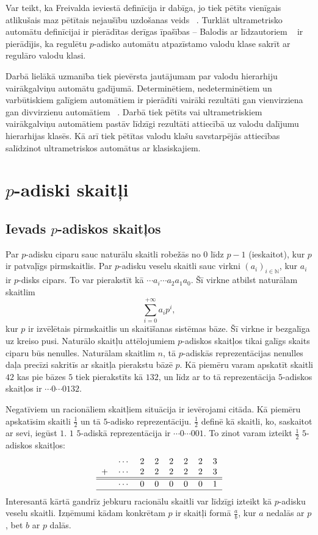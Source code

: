 \documentclass{ludis}
\begin{document}
Var teikt, ka Freivalda ieviestā definīcija ir dabīga, jo tiek pētīts vienīgais atlikušais maz pētītais nejaušību uzdošanas veids ~\citep{Freivalds2012}. Turklāt ultrametrisko automātu definīcijai ir pierādītas derīgas īpašības -- Balodis ar līdzautoriem ~\citep{KasparsBalodis2013} ir pierādījis, ka regulētu $p$-adisko automātu atpazīstamo valodu klase sakrīt ar regulāro valodu klasi.

Darbā lielākā uzmanība tiek pievērsta jautājumam par valodu hierarhiju vairākgalviņu automātu gadījumā. Determinētiem, nedeterminētiem un varbūtiskiem galīgiem automātiem ir pierādīti vairāki rezultāti gan vienvirziena gan divvirzienu automātiem ~\citep{Holzer2009,Yao1978,Monien1980,Macarie1995}. Darbā tiek pētīts vai ultrametriskiem vairākgalviņu automātiem pastāv līdzīgi rezultāti attiecībā uz valodu dalījumu hierarhijas klasēs. Kā arī tiek pētītas valodu klašu savstarpējās attiecības salīdzinot ultrametriskos automātus ar klasiskajiem.
\chapter{$p$-adiski skaitļi}
\section{Ievads $p$-adiskos skaitļos}
Par $p$-adisku ciparu sauc naturālu skaitli robežās no $0$ līdz $p-1$ (ieskaitot), kur $p$ ir patvaļīgs pirmskaitlis. Par $p$-adisku veselu skaitli sauc virkni $(a_i)_{i \in \mathbb{N}}$, kur $a_i$ ir $p$-disks cipars. To var pierakstīt kā $\cdots a_i \cdots a_2a_1a_0$.
Šī virkne atbilst naturālam skaitlim
\[\sum\limits_{i=0}^{+\infty}a_ip^i,
\]
kur $p$ ir izvēlētais pirmskaitlis un skaitīšanas sistēmas bāze. Šī virkne ir bezgalīga uz kreiso pusi. Naturālo skaitļu attēlojumiem $p$-adiskos skaitļos tikai galīgs skaits ciparu būs nenulles. Naturālam skaitlim $n$, tā $p$-adiskās reprezentācijas nenulles daļa precīzi sakritīs ar skaitļa pierakstu bāzē $p$. Kā piemēru varam apskatīt skaitli $42$ kas pie bāzes $5$ tiek pierakstīts kā $132$, un līdz ar to tā reprezentācija $5$-adiskos skaitļos ir $\cdots 0 \cdots 0132$.

Negatīviem un racionāliem skaitļiem situācija ir ievērojami citāda. Kā piemēru apskatīsim skaitli $\frac{1}{2}$ un tā $5$-adisko reprezentāciju. $\frac{1}{2}$ definē kā skaitli, ko, saskaitot ar sevi, iegūst $1$. $1$ $5$-adiskā reprezentācija ir $\cdots 0 \cdots 001$. To zinot varam izteikt $\frac{1}{2}$ $5$-adiskos skaitļos:
\[
\begin{tabular}{rrrrrrrrr|}
&$\cdots$ &2 &2 &2 &2 &2 &3\\
+&$\cdots$ &2 &2 &2 &2 &2 &3\\
\hline
\hline
&$\cdots$ &0 &0 &0 &0 &0 &1\\
\hline
\end{tabular}
\]
Interesantā kārtā gandrīz jebkuru racionālu skaitli var līdzīgi izteikt kā $p$-adisku veselu skaitli.
Izņēmumi kādam konkrētam $p$ ir skaitļi formā $\frac{a}{b}$, kur $a$ nedalās ar $p$, bet $b$ ar $p$ dalās.
\end{document}
